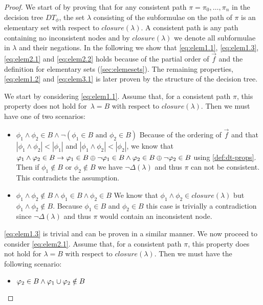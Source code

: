 \begin{proof}
We start of by proving that for any consistent path $\pi=\pi_0,\ldots,\pi_n$ in the decision tree $DT_\phi$, the set $\lambda$ consisting of the subformulae on the path of $\pi$ is an elementary set with respect to $closure(\lambda)$. A consistent path is any path containing no inconsistent nodes and by $closure(\lambda)$ we denote all subformulae in $\lambda$ and their negations. In the following we show that \autoref{eq:elem1.1}, \autoref{eq:elem1.3}, \autoref{eq:elem2.1} and \autoref{eq:elem2.2} holds because of the partial order of $\vec{f}$ and the definition for elementary sets (\autoref{sec:elemesets}). The remaining properties, \autoref{eq:elem1.2} and \autoref{eq:elem3.1} is later proven by the structure of the decision tree.

We start by considering \autoref{eq:elem1.1}. Assume that, for a consistent path $\pi$, this property does not hold for~$\lambda=B$ with respect to $closure(\lambda)$. Then we must have one of two scenarios:
\begin{itemize}
    \item $\phi_1 \land \phi_2 \in B \land \lnot(\phi_1 \in B \text{ and } \phi_2 \in B)$ \quad
    Because of the ordering of $\vec{f}$ and that $|\phi_1 \land \phi_2| < |\phi_1|$ and $|\phi_1 \land \phi_2| < |\phi_2|$, we know that $\varphi_1 \land \varphi_2 \in B \rightarrow \varphi_1 \in B \oplus \lnot\varphi_1 \in B \land \varphi_2 \in B \oplus \lnot\varphi_2 \in B$ using \autoref{def:dt-props}. Then if $\phi_1 \notin B$ or $\phi_2 \notin B$ we have $\lnot\Delta(\lambda)$ and thus $\pi$ can not be consistent. This contradicts the assumption.
    \item $\phi_1 \land \phi_2 \notin B \land \phi_1 \in B \land \phi_2 \in B$ \quad We know that $\phi_1 \land \phi_2 \in closure(\lambda)$ but $\phi_1 \land \phi_2 \notin B$. Because $\phi_1 \in B$ and $\phi_2 \in B$ this case is trivially a contradiction since $\lnot\Delta(\lambda)$ and thus $\pi$ would contain an inconsistent node.
\end{itemize}
\autoref{eq:elem1.3} is trivial and can be proven in a similar manner. We now proceed to consider \autoref{eq:elem2.1}. Assume that, for a consistent path $\pi$, this property does not hold for $\lambda=B$ with respect to $closure(\lambda)$. Then we must have the following scenario:
\begin{itemize}
    \item $\varphi_2 \in B \land \varphi_1 \cup \varphi_2 \notin B$ \quad

\end{itemize}
\end{proof}
